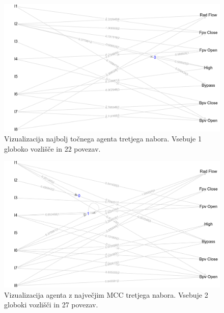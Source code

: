 \begin{figure}[H]
    \begin{center}
        \includegraphics[width=13cm]{shuttle/3/acc_g}
    \end{center}
    \caption{Vizualizacija najbolj točnega agenta tretjega nabora. Vsebuje 1 globoko vozlišče in 22 povezav.}
    \label{fig:statlog_acc_3_g}
\end{figure}

\begin{figure}[H]
    \begin{center}
        \includegraphics[width=13cm]{shuttle/3/mcc_g}
    \end{center}
    \caption{Vizualizacija agenta z največjim MCC tretjega nabora. Vsebuje 2 globoki vozlišči in 27 povezav.}
    \label{fig:statlog_mcc_3_g}
\end{figure}